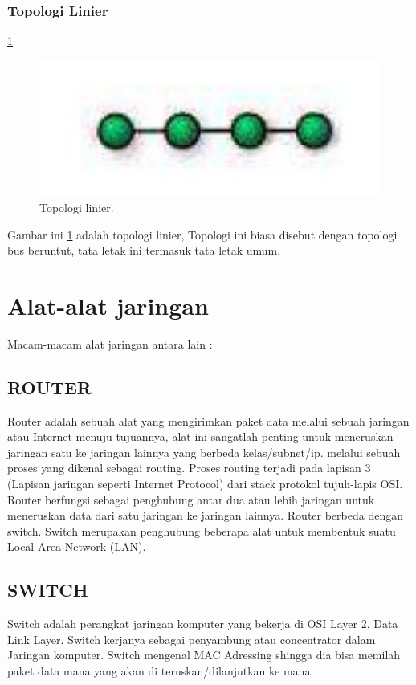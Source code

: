   \subsubsection{Topologi Linier}
    \ref{linier}
    \begin{figure}[ht]
    \centerline{\includegraphics[width=1\textwidth]{figures/linier.JPG}}
    \caption{Topologi linier.}
    \label{linier}
    \end{figure}
    Gambar ini \ref{linier} adalah topologi linier, Topologi ini biasa disebut dengan topologi bus beruntut, tata letak ini termasuk tata letak umum.

\section{Alat-alat jaringan}
Macam-macam alat jaringan antara lain :
  \subsection{ROUTER}
    Router adalah sebuah alat yang mengirimkan paket data melalui sebuah jaringan atau Internet menuju tujuannya, alat ini sangatlah penting untuk meneruskan jaringan satu ke jaringan lainnya yang berbeda kelas/subnet/ip. melalui sebuah proses yang dikenal sebagai routing. Proses routing terjadi pada lapisan 3 (Lapisan jaringan seperti Internet Protocol) dari stack protokol tujuh-lapis OSI.
  Router berfungsi sebagai penghubung antar dua atau lebih jaringan untuk meneruskan data dari satu jaringan ke jaringan lainnya. Router berbeda dengan switch. Switch merupakan penghubung beberapa alat untuk membentuk suatu Local Area Network (LAN).
  \subsection{SWITCH}
    Switch adalah perangkat jaringan komputer yang bekerja di OSI Layer 2, Data Link Layer. Switch kerjanya sebagai penyambung atau concentrator dalam Jaringan komputer. Switch mengenal MAC Adressing shingga dia bisa memilah paket data mana yang akan di teruskan/dilanjutkan ke mana.
